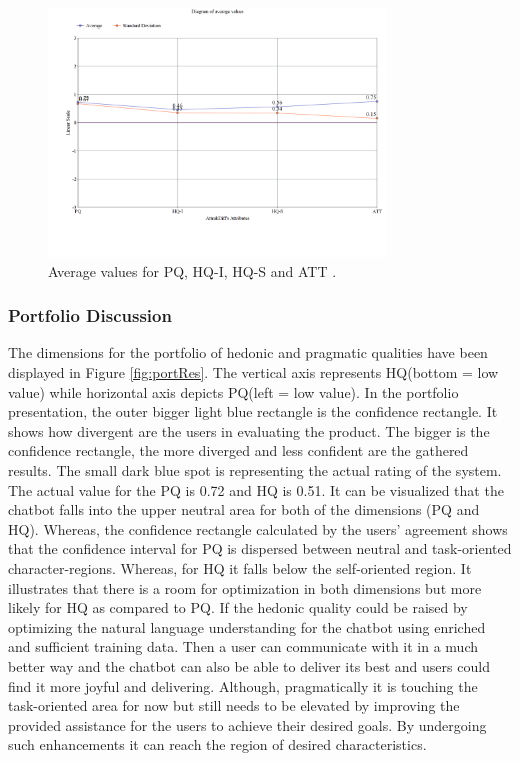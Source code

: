 \begin{figure}[!h]
    \centering
    \includegraphics[width=0.8\textwidth]{img/Diagram_for_Avg_Values.png}
    \caption{Average values for PQ, HQ-I, HQ-S and ATT \cite{attrakdiff}.}
    \label{fig:avgValAttrak}
\end{figure}

\subsubsection*{Portfolio Discussion}
The dimensions for the portfolio of hedonic and pragmatic qualities have been displayed in Figure \ref{fig:portRes}. The vertical axis represents HQ(bottom = low value) while horizontal axis depicts PQ(left = low value). In the portfolio presentation, the outer bigger light blue rectangle is the confidence rectangle. It shows how divergent are the users in evaluating the product. The bigger is the confidence rectangle, the more diverged and less confident are the gathered results. The small dark blue spot is representing the actual rating of the system. The actual value for the PQ is 0.72 and HQ is 0.51. It can be visualized that the chatbot falls into the upper neutral area for both of the dimensions (PQ and HQ). Whereas, the confidence rectangle calculated by the users' agreement shows that the confidence interval for PQ is dispersed between neutral and task-oriented character-regions. Whereas, for HQ it falls below the self-oriented region. It illustrates that there is a room for optimization in both dimensions but more likely for HQ as compared to PQ. If the hedonic quality could be raised by optimizing the natural language understanding for the chatbot using enriched and sufficient training data. Then a user can communicate with it in a much better way and the chatbot can also be able to deliver its best and users could find it more joyful and delivering. Although, pragmatically it is touching the task-oriented area for now but still needs to be elevated by improving the provided assistance for the users to achieve their desired goals. By undergoing such enhancements it can reach the region of desired characteristics.

